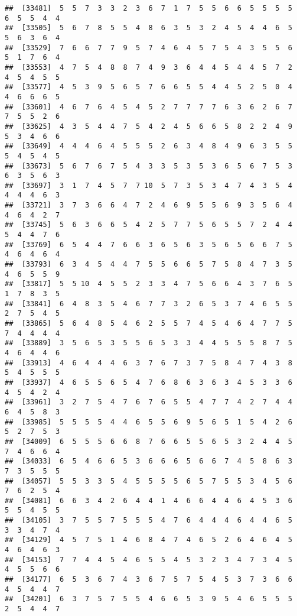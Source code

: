 \documentclass[
]{book}
\begin{document}
\begin{verbatim}
##  [33481]  5  5  7  3  3  2  3  6  7  1  7  5  5  6  6  5  5  5  5  6  5  5  4  4
##  [33505]  5  6  7  8  5  5  4  8  6  3  5  3  2  4  5  4  4  6  5  5  6  3  6  4
##  [33529]  7  6  6  7  7  9  5  7  4  6  4  5  7  5  4  3  5  5  6  5  1  7  6  4
##  [33553]  4  7  5  4  8  8  7  4  9  3  6  4  4  5  4  4  5  7  2  4  5  4  5  5
##  [33577]  4  5  3  9  5  6  5  7  6  6  5  5  4  4  5  2  5  0  4  4  6  6  6  5
##  [33601]  4  6  7  6  4  5  4  5  2  7  7  7  7  6  3  6  2  6  7  7  5  5  2  6
##  [33625]  4  3  5  4  4  7  5  4  2  4  5  6  6  5  8  2  2  4  9  5  3  4  6  6
##  [33649]  4  4  4  6  4  5  5  5  2  6  3  4  8  4  9  6  3  5  5  5  4  5  4  5
##  [33673]  5  6  7  6  7  5  4  3  3  5  3  5  3  6  5  6  7  5  3  6  3  5  6  3
##  [33697]  3  1  7  4  5  7  7 10  5  7  3  5  3  4  7  4  3  5  4  4  4  4  6  3
##  [33721]  3  7  3  6  6  4  7  2  4  6  9  5  5  6  9  3  5  6  4  4  6  4  2  7
##  [33745]  5  6  3  6  6  5  4  2  5  7  7  5  6  5  5  7  2  4  4  5  4  4  7  6
##  [33769]  6  5  4  4  7  6  6  3  6  5  6  3  5  6  5  6  6  7  5  4  6  4  6  4
##  [33793]  6  3  4  5  4  4  7  5  5  6  6  5  7  5  8  4  7  3  5  4  6  5  5  9
##  [33817]  5  5 10  4  5  5  2  3  3  4  7  5  6  6  4  3  7  6  5  1  7  8  3  5
##  [33841]  6  4  8  3  5  4  6  7  7  3  2  6  5  3  7  4  6  5  5  2  7  5  4  5
##  [33865]  5  6  4  8  5  4  6  2  5  5  7  4  5  4  6  4  7  7  5  7  4  4  4  4
##  [33889]  3  5  6  5  3  5  5  6  5  3  3  4  4  5  5  5  8  7  5  4  6  4  4  6
##  [33913]  4  6  4  4  4  6  3  7  6  7  3  7  5  8  4  7  4  3  8  5  4  5  5  5
##  [33937]  4  6  5  5  6  5  4  7  6  8  6  3  6  3  4  5  3  3  6  4  5  4  2  4
##  [33961]  3  2  7  5  4  7  6  7  6  5  5  4  7  7  4  2  7  4  4  6  4  5  8  3
##  [33985]  5  5  5  5  4  4  6  5  5  6  9  5  6  5  1  5  4  2  6  5  2  7  5  3
##  [34009]  6  5  5  5  6  6  8  7  6  6  5  5  6  5  3  2  4  4  5  7  4  6  6  4
##  [34033]  6  5  4  6  6  5  3  6  6  6  5  6  6  7  4  5  8  6  3  7  3  5  5  5
##  [34057]  5  5  3  3  5  4  5  5  5  5  6  5  7  5  5  3  4  5  6  7  6  2  5  4
##  [34081]  6  6  3  4  2  6  4  4  1  4  6  6  4  4  6  4  5  3  6  5  5  4  5  5
##  [34105]  3  7  5  5  7  5  5  5  4  7  6  4  4  4  6  4  4  6  5  3  3  4  7  4
##  [34129]  4  5  7  5  1  4  6  8  4  7  4  6  5  2  6  4  6  4  5  4  6  4  6  3
##  [34153]  7  7  4  4  5  4  6  5  5  4  5  3  2  3  4  7  3  4  5  4  5  5  6  6
##  [34177]  6  5  3  6  7  4  3  6  7  5  7  5  4  5  3  7  3  6  6  4  5  4  4  7
##  [34201]  6  3  7  5  7  5  5  4  6  6  5  3  9  5  4  6  5  5  5  2  5  4  4  7

\end{verbatim}
\end{document}
